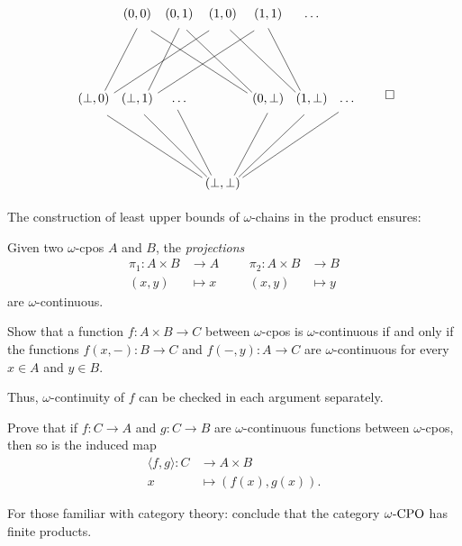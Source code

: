 \begin{example}
  \[
    \begin{tikzcd}[column sep=1pt, row sep=50pt]
      & (0,0) & (0,1) & (1,0) & (1,1) & \dots \\
      (\bot,0) \ar[ur, no head, shift right=5pt]
      \ar[urrr, no head, shift right=5pt]
      & (\bot,1)
      \ar[ur, no head, shift right=5pt]
      \ar[urrr, no head, shift right=5pt]
      & \dots
      &
      & (0,\bot)
      \ar[ulll, no head, shift left=5pt]
      \ar[ull, no head, shift left=5pt]
      & (1,\bot)
      \ar[ull, no head, shift left=5pt]
      \ar[ul, no head, shift left=5pt]
      & \dots \\
      & & & (\bot,\bot)
      \ar[ulll,no head, shift left=5pt] \ar[ull, no head, shift left=5pt]
      \ar[ul, no head, shift left=5pt] \ar[ur, no head, shift right=5pt]
      \ar[urr, no head, shift right=5pt] \ar[urrr, no head, shift right=5pt]
    \end{tikzcd}\qedhere
  \]
\end{example}

The construction of least upper bounds of \(\omega\)-chains in the product
ensures:
\begin{lemma}\label{projections}
  Given two \(\omega\)-cpos \(A\) and \(B\), the \emph{projections}
  \begin{align*}
    \pi_1 \colon A \times B &\to A &&& \pi_2 \colon A \times B &\to B \\
    (x,y) &\mapsto x &&& (x,y) &\mapsto y
  \end{align*}
  are \(\omega\)-continuous.
\end{lemma}

\begin{exercise}\label{exer:continuity-in-each-argument}
  Show that a function \(f \colon A \times B \to C\) between \(\omega\)-cpos is
  \(\omega\)-continuous if and only if the functions \(f(x,-) \colon B \to C\) and
  \(f(-,y) \colon A \to C\) are \(\omega\)-continuous for every \(x \in A\) and
  \(y \in B\).

  Thus, \(\omega\)-continuity of \(f\) can be checked in each argument
  separately.
\end{exercise}

\begin{exercise}\label{exer:product-induced}
  Prove that if \(f \colon C \to A\) and \(g \colon C \to B\) are
  \(\omega\)-continuous functions between \(\omega\)-cpos, then so is the
  induced map
  \begin{align*}
    \langle f , g \rangle  \colon C &\to A \times B \\
    x &\mapsto (f(x),g(x)).
  \end{align*}

  For those familiar with category theory: conclude that the category
  \(\omegaCPO\) has finite products.
\end{exercise}

